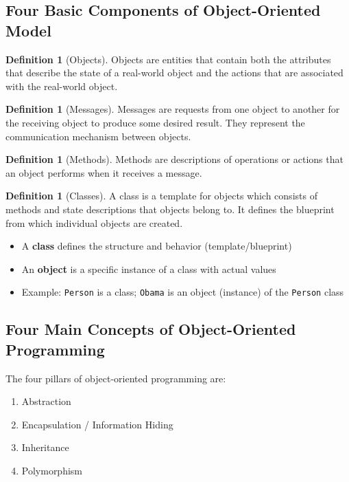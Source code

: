 \documentclass[11pt, a4paper, notitlepage]{report}
\theoremstyle{definition}
\newtheorem{definition}[theorem]{Definition}
\theoremstyle{remark}
\theoremstyle{definition}
\begin{document}
\subsection{Four Basic Components of Object-Oriented Model}

\begin{definition}[Objects]
\label{def:ch1-oo-objects}
Objects are entities that contain both the attributes that describe the state of a real-world object and the actions that are associated with the real-world object.
\end{definition}

\begin{definition}[Messages]
\label{def:ch1-messages}
Messages are requests from one object to another for the receiving object to produce some desired result. They represent the communication mechanism between objects.
\end{definition}

\begin{definition}[Methods]
\label{def:ch1-methods}
Methods are descriptions of operations or actions that an object performs when it receives a message.
\end{definition}

\begin{definition}[Classes]
\label{def:ch1-classes}
A class is a template for objects which consists of methods and state descriptions that objects belong to. It defines the blueprint from which individual objects are created.
\end{definition}

\begin{keyresult}[title={Class vs. Object Relationship}]
\begin{itemize}
  \item A \textbf{class} defines the structure and behavior (template/blueprint)
  \item An \textbf{object} is a specific instance of a class with actual values
  \item Example: \texttt{Person} is a class; \texttt{Obama} is an object (instance) of the \texttt{Person} class
\end{itemize}
\end{keyresult}

\subsection{Four Main Concepts of Object-Oriented Programming}

The four pillars of object-oriented programming are:
\begin{enumerate}
  \item Abstraction
  \item Encapsulation / Information Hiding
  \item Inheritance
  \item Polymorphism
\end{enumerate}
\end{document}

